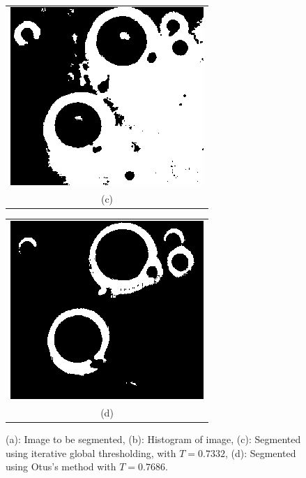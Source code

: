 \begin{figure}[h!]
\\
\begin{minipage}{.45\textwidth}
\begin{tabular}{c}
\includegraphics[width=.9\textwidth]{segmentation/globalThresholded} \\
(c)
\end{tabular}
\end{minipage}
\begin{minipage}{.45\textwidth}
\begin{tabular}{c}
\includegraphics[width=.9\textwidth]{segmentation/otsuThresholded} \\
(d)
\end{tabular}
\end{minipage}
\caption{(a): Image to be segmented, (b): Histogram of image, (c): Segmented using iterative global thresholding, with $T = 0.7332$, (d): Segmented using Otus's method with $T = 0.7686$.}
\label{thresholding}
\end{figure}

